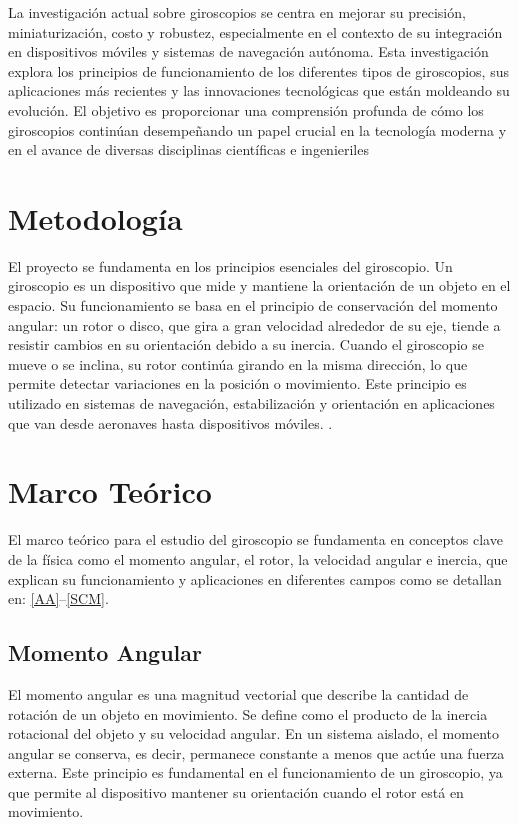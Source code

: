 \documentclass[conference]{IEEEtran}
\begin{document}
La investigación actual sobre giroscopios se centra en mejorar su precisión, miniaturización, costo y robustez, especialmente en el contexto de su integración en dispositivos móviles y sistemas de navegación autónoma. Esta investigación explora los principios de funcionamiento de los diferentes tipos de giroscopios, sus aplicaciones más recientes y las innovaciones tecnológicas que están moldeando su evolución. El objetivo es proporcionar una comprensión profunda de cómo los giroscopios continúan desempeñando un papel crucial en la tecnología moderna y en el avance de diversas disciplinas científicas e ingenieriles

\section{Metodología}

El proyecto se fundamenta en los principios esenciales del giroscopio. Un giroscopio es un dispositivo que mide y mantiene la orientación de un objeto en el espacio. Su funcionamiento se basa en el principio de conservación del momento angular: un rotor o disco, que gira a gran velocidad alrededor de su eje, tiende a resistir cambios en su orientación debido a su inercia. Cuando el giroscopio se mueve o se inclina, su rotor continúa girando en la misma dirección, lo que permite detectar variaciones en la posición o movimiento. Este principio es utilizado en sistemas de navegación, estabilización y orientación en aplicaciones que van desde aeronaves hasta dispositivos móviles.  \cite{rosales2017diseno, alvarez2015sistema, diaz2005modelado}.

\section{Marco Teórico}
El marco teórico para el estudio del giroscopio se fundamenta en conceptos clave de la física como el momento angular, el rotor, la velocidad angular e inercia, que explican su funcionamiento y aplicaciones en diferentes campos como se detallan en: \ref{AA}--\ref{SCM}.

\subsection{Momento Angular}

El momento angular es una magnitud vectorial que describe la cantidad de rotación de un objeto en movimiento. Se define como el producto de la inercia rotacional del objeto y su velocidad angular. En un sistema aislado, el momento angular se conserva, es decir, permanece constante a menos que actúe una fuerza externa. Este principio es fundamental en el funcionamiento de un giroscopio, ya que permite al dispositivo mantener su orientación cuando el rotor está en movimiento.
\end{document}
